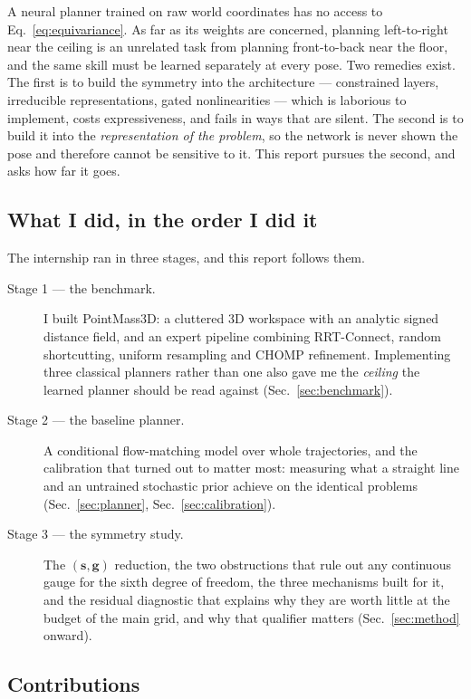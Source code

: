 \documentclass[11pt,a4paper]{article}
\newcommand{\svec}{\mathbf{s}}
\newcommand{\gvec}{\mathbf{g}}
\begin{document}
A neural planner trained on raw world coordinates has no access to
Eq.~\eqref{eq:equivariance}. As far as its weights are concerned, planning
left-to-right near the ceiling is an unrelated task from planning front-to-back
near the floor, and the same skill must be learned separately at every pose. Two
remedies exist. The first is to build the symmetry into the architecture ---
constrained layers, irreducible representations, gated nonlinearities --- which
is laborious to implement, costs expressiveness, and fails in ways that are
silent. The second is to build it into the \emph{representation of the problem},
so the network is never shown the pose and therefore cannot be sensitive to it.
This report pursues the second, and asks how far it goes.

\subsection{What I did, in the order I did it}

The internship ran in three stages, and this report follows them.

\begin{description}
  \item[Stage 1 --- the benchmark.] I built PointMass3D: a cluttered 3D
  workspace with an analytic signed distance field, and an expert pipeline
  combining RRT-Connect, random shortcutting, uniform resampling and CHOMP
  refinement. Implementing three classical planners rather than one also gave me
  the \emph{ceiling} the learned planner should be read against
  (Sec.~\ref{sec:benchmark}).
  \item[Stage 2 --- the baseline planner.] A conditional flow-matching model
  over whole trajectories, and the calibration that turned out to matter most:
  measuring what a straight line and an untrained stochastic prior achieve on
  the identical problems (Sec.~\ref{sec:planner}, Sec.~\ref{sec:calibration}).
  \item[Stage 3 --- the symmetry study.] The $(\svec,\gvec)$ reduction, the two
  obstructions that rule out any continuous gauge for the sixth degree of
  freedom, the three mechanisms built for it, and the residual diagnostic that explains why they are
  worth little at the budget of the main grid, and why that qualifier matters
  (Sec.~\ref{sec:method} onward).
\end{description}

\subsection{Contributions}
\end{document}
